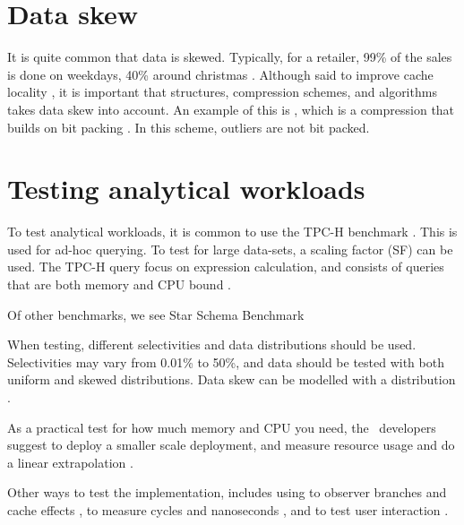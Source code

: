 \section{Data skew}
\label{sec:Data skew}
It is quite common that data is skewed. Typically, for a retailer, 99\% of the sales is done on weekdays, 40\% around christmas \cite{Raman2008-gi}. Although said to improve cache locality \cite{Larson2013-mc}, it is important that structures, compression schemes, and algorithms takes data skew into account. An example of this is , which is a compression that builds on bit packing \cite{Bjorklund2011-wh}. In this scheme, outliers are not bit packed.


\section{Testing analytical workloads}
\label{sec:Testing analytical workloads}
To test analytical workloads, it is common to use the TPC-H benchmark \cite{Boncz2002-yj}. This is used for ad-hoc querying. To test for large data-sets, a scaling factor (SF) can be used. The TPC-H query focus on expression calculation, and consists of queries that are both memory and CPU bound \cite{Boncz2005-wj}.

Of other benchmarks, we see Star Schema Benchmark \cite{Boncz2002-yj}

When testing, different selectivities and data distributions should be used. Selectivities may vary from 0.01\% to 50\%, and data should be tested with both uniform and skewed distributions. Data skew can be modelled with a  distribution \cite{Holloway2008-rr}.

As a practical test for how much memory and CPU you need, the \qlikview~developers suggest to deploy a smaller scale deployment, and measure resource usage and do a linear extrapolation \cite{Qlik2011-yc}.

Other ways to test the implementation, includes using  to observer branches and cache effects \cite{Neumann2011-uq},  to measure cycles and nanoseconds \cite{Willhalm2013-ri}, and  to test user interaction \cite{Qlik2012-ku}.


